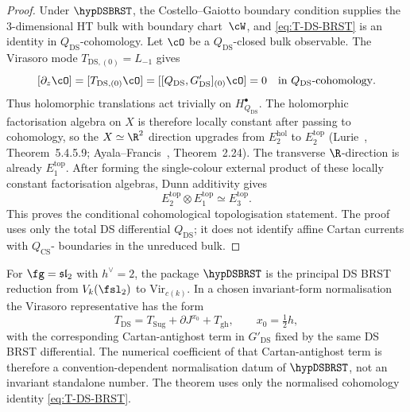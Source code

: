 \begin{proof}
Under \(\hypDSBRST\), the Costello--Gaiotto boundary condition supplies
the \(3\)-dimensional HT bulk with boundary chart~\(\cW\), and
\eqref{eq:T-DS-BRST} is an identity in
\(Q_{\mathrm{DS}}\)-cohomology.  Let \(\cO\) be a
\(Q_{\mathrm{DS}}\)-closed bulk observable.  The Virasoro mode
\(T_{\mathrm{DS},(0)}=L_{-1}\) gives
\[
[\partial_z\cO]
= [T_{\mathrm{DS},(0)}\cO]
= [[Q_{\mathrm{DS}},G'_{\mathrm{DS}}]_{(0)}\cO]
=0
\quad\text{in }Q_{\mathrm{DS}}\text{-cohomology}.
\]
Thus holomorphic translations act trivially on
\(H^\bullet_{Q_{\mathrm{DS}}}\).  The holomorphic factorisation
algebra on \(X\) is therefore locally constant after passing to
cohomology, so the \(X\simeq\R^2\) direction upgrades from
\(E_2^{\mathrm{hol}}\) to \(E_2^{\mathrm{top}}\)
\textup{(}Lurie~\cite{HA}, Theorem~5.4.5.9;
Ayala--Francis~\cite{AF15}, Theorem~2.24\textup{)}.  The transverse
\(\R\)-direction is already \(E_1^{\mathrm{top}}\).  After forming the
single-colour external product of these locally constant
factorisation algebras, Dunn additivity gives
\[
E_2^{\mathrm{top}}\otimes E_1^{\mathrm{top}}
\simeq E_3^{\mathrm{top}}.
\]
This proves the conditional cohomological topologisation statement.
The proof uses only the total DS differential \(Q_{\mathrm{DS}}\); it
does not identify affine Cartan currents with \(Q_{\mathrm{CS}}\)-
boundaries in the unreduced bulk.
\end{proof}

\begin{remark}
\label{rem:DS-BRST-sl2}
For $\fg = \mathfrak{sl}_2$ with
$h^\vee = 2$, the package \(\hypDSBRST\) is the principal DS BRST
reduction from \(V_k(\fsl_2)\) to \(\mathrm{Vir}_{c(k)}\).  In a
chosen invariant-form normalisation the Virasoro representative has
the form
\[
T_{\mathrm{DS}}
=T_{\mathrm{Sug}}+\partial J^{x_0}+T_{\mathrm{gh}},
\qquad x_0=\tfrac12 h,
\]
with the corresponding Cartan-antighost term in \(G'_{\mathrm{DS}}\)
fixed by the same DS BRST differential.  The numerical coefficient of
that Cartan-antighost term is therefore a convention-dependent
normalisation datum of \(\hypDSBRST\), not an invariant standalone
number.  The theorem uses only the normalised cohomology identity
\eqref{eq:T-DS-BRST}.
\end{remark}

